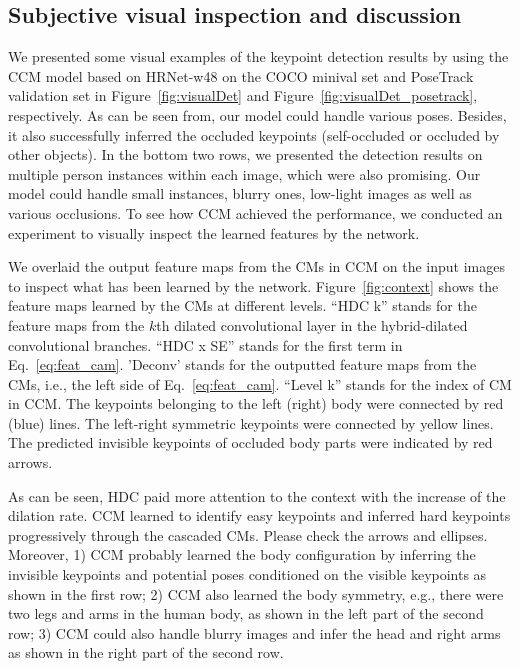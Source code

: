 \documentclass[twocolumn]{svjour3}          \smartqed  \usepackage{natbib}
\begin{document}
\subsection{Subjective visual inspection and discussion}
\label{subsec:subjective}
We presented some visual examples of the keypoint detection results by using the CCM model based on HRNet-w48 on the COCO minival set and PoseTrack validation set in Figure~\ref{fig:visualDet} and Figure~\ref{fig:visualDet_posetrack}, respectively. As can be seen from, our model could handle various poses. Besides, it also successfully inferred the occluded keypoints (self-occluded or occluded by other objects). In the bottom two rows, we presented the detection results on multiple person instances within each image, which were also promising. Our model could handle small instances, blurry ones, low-light images as well as various occlusions. To see how CCM achieved the performance, we conducted an experiment to visually inspect the learned features by the network. 

We overlaid the output feature maps from the CMs in CCM on the input images to inspect what has been learned by the network. Figure~\ref{fig:context} shows the feature maps learned by the CMs at different levels. ``HDC k'' stands for the feature maps from the $k$th dilated convolutional layer in the hybrid-dilated convolutional branches. ``HDC x SE'' stands for the first term in Eq.~\eqref{eq:feat_cam}. 'Deconv' stands for the outputted feature maps from the CMs, i.e., the left side of Eq.~\eqref{eq:feat_cam}. ``Level k'' stands for the index of CM in CCM. The keypoints belonging to the left (right) body were connected by red (blue) lines. The left-right symmetric keypoints were connected by yellow lines. The predicted invisible keypoints of occluded body parts were indicated by red arrows.

As can be seen, HDC paid more attention to the context with the increase of the dilation rate. CCM learned to identify easy keypoints and inferred hard keypoints progressively through the cascaded CMs. Please check the arrows and ellipses. Moreover, 1) CCM probably learned the body configuration by inferring the invisible keypoints and potential poses conditioned on the visible keypoints as shown in the first row; 2) CCM also learned the body symmetry, e.g., there were two legs and arms in the human body, as shown in the left part of the second row; 3) CCM could also handle blurry images and infer the head and right arms as shown in the right part of the second row.
\end{document}
